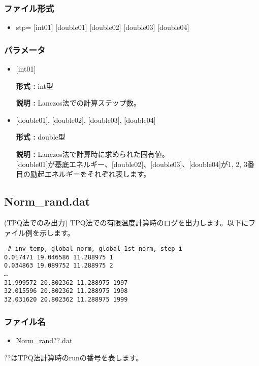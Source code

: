 \subsubsection{ファイル形式}
 \begin{itemize}
   \item stp= $[$int01$]$ $[$double01$]$ $[$double02$]$ $[$double03$]$ $[$double04$]$
  \end{itemize}
\subsubsection{パラメータ}
 \begin{itemize}

  \item  $[$int01$]$
  
 {\bf 形式 :} int型

{\bf 説明 :} Lanczos法での計算ステップ数。
 
  \item  $[$double01$]$, $[$double02$]$, $[$double03$]$, $[$double04$]$

 {\bf 形式 :} double型 

{\bf 説明 :} Lanczos法で計算時に求められた固有値。\\
$[$double01$]$が基底エネルギー、$[$double02$]$、$[$double03$]$、$[$double04$]$が1, 2, 3番目の励起エネルギーをそれぞれ表します。

 \end{itemize}

\newpage
\subsection{Norm\_rand.dat}
\label{Subsec:normrand}
(TPQ法でのみ出力) TPQ法での有限温度計算時のログを出力します。以下にファイル例を示します。\\
\begin{minipage}{12.5cm}
\begin{screen}
\begin{verbatim}
 # inv_temp, global_norm, global_1st_norm, step_i 
0.017471 19.046586 11.288975 1
0.034863 19.089752 11.288975 2
…
31.999572 20.802362 11.288975 1997
32.015596 20.802362 11.288975 1998
32.031620 20.802362 11.288975 1999
\end{verbatim}
\end{screen}
\end{minipage}

\subsubsection{ファイル名}
\begin{itemize}
   \item Norm\_rand??.dat
  \end{itemize}
  ??はTPQ法計算時のrunの番号を表します。


